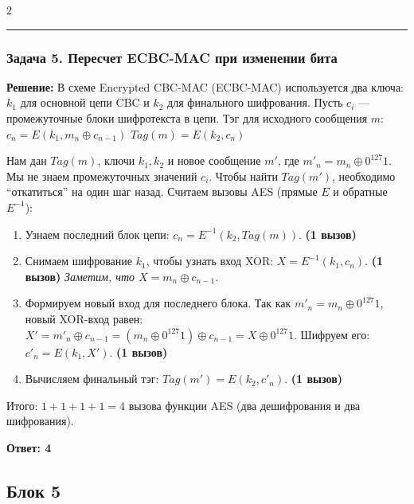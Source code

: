 ﻿\documentclass[10pt,a4paper,landscape]{extarticle}
\newcommand{\tightlist}{}
\begin{document}
\begin{multicols*}{2}
\begin{center}\rule{0.5\linewidth}{0.5pt}\end{center}

\subsubsection{Задача 5. Пересчет ECBC-MAC при изменении бита}\label{ux437ux430ux434ux430ux447ux430-5.-ux43fux435ux440ux435ux441ux447ux435ux442-ecbc-mac-ux43fux440ux438-ux438ux437ux43cux435ux43dux435ux43dux438ux438-ux431ux438ux442ux430}

\textbf{Решение:} В схеме Encrypted CBC-MAC (ECBC-MAC) используется два ключа: \(k_1\) для основной цепи CBC и \(k_2\) для финального шифрования. Пусть \(c_{i}\) --- промежуточные блоки шифротекста в цепи. Тэг для исходного сообщения \(m\): \(c_n = E(k_1, m_n \oplus c_{n-1})\) \(Tag(m) = E(k_2, c_n)\)

Нам дан \(Tag(m)\), ключи \(k_1, k_2\) и новое сообщение \(m'\), где \(m'_n = m_n \oplus 0^{127}1\). Мы не знаем промежуточных значений \(c_i\). Чтобы найти \(Tag(m')\), необходимо ``откатиться'' на один шаг назад. Считаем вызовы AES (прямые \(E\) и обратные \(E^{-1}\)):

\begin{enumerate}
\def\labelenumi{\arabic{enumi}.}
\tightlist
\item
  Узнаем последний блок цепи: \(c_n = E^{-1}(k_2, Tag(m))\). \textbf{(1 вызов)}
\item
  Снимаем шифрование \(k_1\), чтобы узнать вход XOR: \(X = E^{-1}(k_1, c_n)\). \textbf{(1 вызов)} \emph{Заметим, что \(X = m_n \oplus c_{n-1}\).}
\item
  Формируем новый вход для последнего блока. Так как \(m'_n = m_n \oplus 0^{127}1\), новый XOR-вход равен: \(X' = m'_n \oplus c_{n-1} = (m_n \oplus 0^{127}1) \oplus c_{n-1} = X \oplus 0^{127}1\). Шифруем его: \(c'_n = E(k_1, X')\). \textbf{(1 вызов)}
\item
  Вычисляем финальный тэг: \(Tag(m') = E(k_2, c'_n)\). \textbf{(1 вызов)}
\end{enumerate}

Итого: \(1 + 1 + 1 + 1 = 4\) вызова функции AES (два дешифрования и два шифрования).

\textbf{Ответ: 4}

\subsection{Блок 5}\label{ux431ux43bux43eux43a-5}


\end{multicols*}
\end{document}
